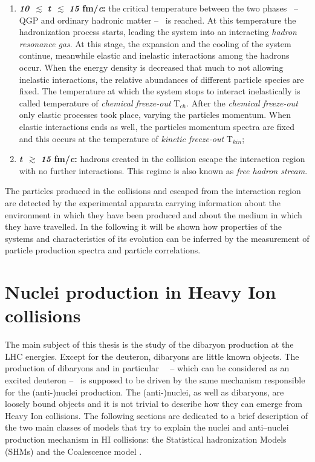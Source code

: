 \begin{enumerate}
    \item \textbf{\textit{10}} $\, \pmb{\lesssim}$ \textbf{\textit{t}} $\, \pmb{\lesssim}$ \textbf{\textit{15} fm/\textit{c}:}
            the critical temperature between the two phases \ -- QGP and ordinary hadronic matter -- \ is reached.
            At this temperature the hadronization process starts, leading the system into an interacting
            \textit{hadron resonance gas}. At this stage, the expansion and the cooling of the system continue, 
            meanwhile elastic and inelastic interactions among the hadrons occur. 
            When the energy density is decreased that much to not allowing inelastic interactions, the relative 
            abundances of different particle species are fixed. The temperature at which the system stops to 
            interact inelastically is called temperature of \textit{chemical freeze-out} T$_{ch}$. After the
            \textit{chemical freeze-out} only elastic processes took place, varying the particles momentum.
            When elastic interactions ends as well, the particles momentum spectra are fixed and this occurs
            at the temperature of \textit{kinetic freeze-out} T$_{kin}$;

    \item \textbf{\textit{t}} $\, \pmb{\gtrsim}$ \textbf{\textit{15} fm/\textit{c}:} hadrons created in 
            the collision escape the interaction region with no further interactions. This regime is 
            also known as \textit{free hadron stream}.
\end{enumerate}

The particles produced in the collisions and escaped from the interaction region are detected by 
the experimental apparata carrying information about the environment in 
which they have been produced and about the medium in which they have travelled. 
In the following it will be shown how properties of the systems and characteristics of its 
evolution can be inferred by the measurement of particle production spectra and particle correlations.

%
%
\section{Nuclei production in Heavy Ion collisions} \label{sec:1.4}

The main subject of this thesis is the study of the \dst dibaryon production at the LHC energies.
Except for the deuteron, dibaryons are little known objects.
The production of dibaryons and in particular \dst \ \ -- which can be considered as an excited deuteron -- \ 
is supposed to be driven by the same mechanism responsible for the (anti-)nuclei production.
The (anti-)nuclei, as well as dibaryons, are loosely bound objects and it is not trivial to describe how they 
can emerge from Heavy Ion collisions. 
The following sections are dedicated to a brief description of the two main classes of models
that try to explain the nuclei and anti–nuclei production mechanism in HI collisions: the Statistical 
hadronization Models (SHMs) \cite{thermalmodel} and the Coalescence model \cite{deuprod}.

